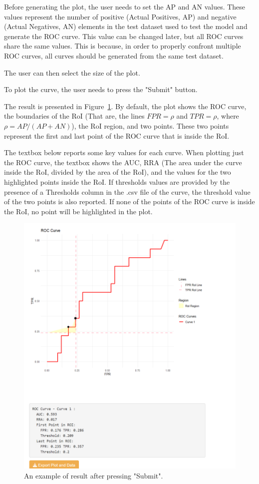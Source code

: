 \documentclass{article}
\begin{document}
	 Before generating the plot, the user needs to set the AP and AN values. These values represent the number of positive (Actual Positives, AP) and negative (Actual Negatives, AN) elements in the test dataset used to test the model and generate the ROC curve. 
	 This value can be changed later, but all ROC curves share the same values. This is because, in order to properly confront multiple ROC curves, all curves should be generated from the same test dataset.
	 
	 The user can then select the size of the plot.
	 
	 To plot the curve, the user needs to press the "Submit" button.
	 
	 The result is presented in Figure~\ref{fig:submitresult}. By default, the plot shows the ROC curve, the boundaries of the RoI (That are, the lines $FPR=\rho$ and $TPR=\rho$, where $\rho = AP/(AP+AN)$), the RoI region, and two points. These two points represent the first and last point of the ROC curve that is inside the RoI. 
	 
	 The textbox below reports some key values for each curve. When plotting just the ROC curve, the textbox shows the AUC, RRA (The area under the curve inside the RoI, divided by the area of the RoI), and the values for the two highlighted points inside the RoI. If thresholds values are provided by the presence of a Thresholds column in the .csv file of the curve, the threshold value of the two points is also reported. If none of the points of the ROC curve is inside the RoI, no point will be highlighted in the plot.
	 
	 \begin{figure}[h!]
	 	\centering
	 	\caption{An example of result after pressing "Submit".}
	 	\label{fig:submitresult}
	 	\includegraphics[width=1\linewidth]{Figures/submit_result1.png}
	 \end{figure}
	 	 
\end{document}
